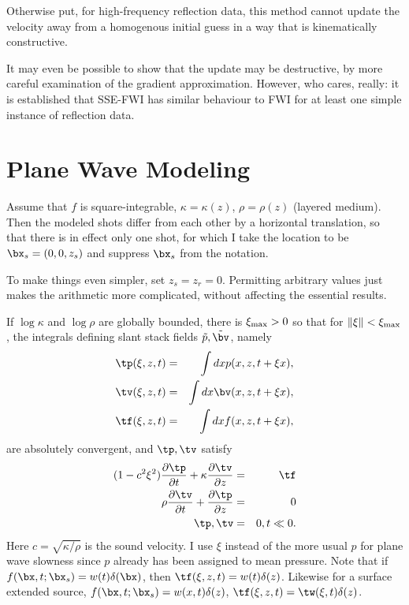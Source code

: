 Otherwise put, for high-frequency reflection data, this method cannot
update the velocity away from a homogenous initial guess in a way that
is kinematically constructive.

It may even be possible to show that the update may be destructive, by
more careful examination of the gradient approximation. However, who
cares, really: it is established that SSE-FWI has similar behaviour to
FWI for at least one simple instance of reflection data.

\section{Plane Wave Modeling}

Assume that $f$ is square-integrable, $\kappa = \kappa(z)$,
$\rho=\rho(z)$ (layered medium). Then the modeled shots differ from
each other by a horizontal translation, so that there is in effect
only one shot, for which I take the location to be
$\bx_s=(0,0,z_s)$ and suppress $\bx_s$ from the notation.

To make things even simpler, set $z_s=z_r=0$. Permitting arbitrary
values just makes the arithmetic more complicated, without affecting
the essential results.

 If $\log \kappa$ and $\log \rho$ are globally
bounded, there is $\xi_{\rm max} > 0$ so that for $\|\xi\|<\xi_{\rm
  max}$, the integrals defining slant stack fields
$\tilde{p},\tilde{\bv}$, namely
\begin{eqnarray}
\label{eqn:slant}
\tp(\xi,z,t)& = &\int dx p(x,z,t+\xi x),\nonumber\\
\tv(\xi,z,t)&=&\int dx \bv(x,z,t+\xi x),\nonumber\\
\tf(\xi,z,t)&=&\int dx f(x,z,t+\xi x),
\end{eqnarray}
are absolutely convergent, and $\tp, \tv$ satisfy 
\begin{eqnarray}
\label{eqn:awepw}
(1-c^2\xi^2)\frac{\partial \tp}{\partial t} + \kappa\frac{\partial
  \tv}{\partial z} &=& \tf \nonumber\\
\rho \frac{\partial \tv}{\partial t} + \frac{\partial \tp}{\partial
  z}&=&0\nonumber\\
\tp,\tv&=&0, t \ll 0.
\end{eqnarray}
Here $c=\sqrt{\kappa/\rho}$ is the sound velocity. I use $\xi$ instead
of the more usual $p$ for plane wave slowness since $p$ already has
been assigned to mean pressure. Note that if
$f(\bx,t;\bx_s)=w(t)\delta(\bx)$, then
$\tf(\xi,z,t)=w(t)\delta(z)$. Likewise for a surface extended source,
$f(\bx,t;\bx_s) = w(x,t)\delta(z)$, $\tf(\xi,z,t) = \tw(\xi,t)\delta(z)$.

